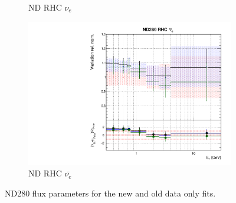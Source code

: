 \begin{figure}
\begin{subfigure}{0.45\textwidth}
  \caption{ND RHC $\nu_{e}$}
\end{subfigure}
\begin{subfigure}{0.45\textwidth}
  \centering
  \includegraphics[width=0.75\linewidth]{figs/newolddatafitsflux_7}
  \caption{ND RHC $\bar{\nu_e}$}
\end{subfigure}
\caption{ND280 flux parameters for the new and old data only fits.}
\label{fig:newolddatafluxND}
\end{figure}

